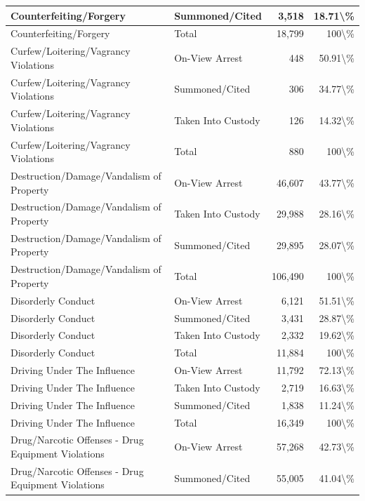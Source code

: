 \documentclass[
]{krantz}
\begin{document}
\begin{longtable}[t]{l|l|r|r}
\hline
Counterfeiting/Forgery & Summoned/Cited & 3,518 & 18.71\textbackslash{}\%\\
\hline
Counterfeiting/Forgery & Total & 18,799 & 100\textbackslash{}\%\\
\hline
Curfew/Loitering/Vagrancy Violations & On-View Arrest & 448 & 50.91\textbackslash{}\%\\
\hline
Curfew/Loitering/Vagrancy Violations & Summoned/Cited & 306 & 34.77\textbackslash{}\%\\
\hline
Curfew/Loitering/Vagrancy Violations & Taken Into Custody & 126 & 14.32\textbackslash{}\%\\
\hline
Curfew/Loitering/Vagrancy Violations & Total & 880 & 100\textbackslash{}\%\\
\hline
Destruction/Damage/Vandalism of Property & On-View Arrest & 46,607 & 43.77\textbackslash{}\%\\
\hline
Destruction/Damage/Vandalism of Property & Taken Into Custody & 29,988 & 28.16\textbackslash{}\%\\
\hline
Destruction/Damage/Vandalism of Property & Summoned/Cited & 29,895 & 28.07\textbackslash{}\%\\
\hline
Destruction/Damage/Vandalism of Property & Total & 106,490 & 100\textbackslash{}\%\\
\hline
Disorderly Conduct & On-View Arrest & 6,121 & 51.51\textbackslash{}\%\\
\hline
Disorderly Conduct & Summoned/Cited & 3,431 & 28.87\textbackslash{}\%\\
\hline
Disorderly Conduct & Taken Into Custody & 2,332 & 19.62\textbackslash{}\%\\
\hline
Disorderly Conduct & Total & 11,884 & 100\textbackslash{}\%\\
\hline
Driving Under The Influence & On-View Arrest & 11,792 & 72.13\textbackslash{}\%\\
\hline
Driving Under The Influence & Taken Into Custody & 2,719 & 16.63\textbackslash{}\%\\
\hline
Driving Under The Influence & Summoned/Cited & 1,838 & 11.24\textbackslash{}\%\\
\hline
Driving Under The Influence & Total & 16,349 & 100\textbackslash{}\%\\
\hline
Drug/Narcotic Offenses - Drug Equipment Violations & On-View Arrest & 57,268 & 42.73\textbackslash{}\%\\
\hline
Drug/Narcotic Offenses - Drug Equipment Violations & Summoned/Cited & 55,005 & 41.04\textbackslash{}\%\\

\end{longtable}
\end{document}

